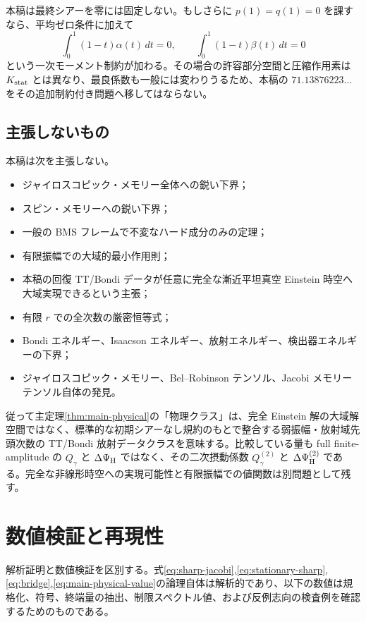 本稿は最終シアーを零には固定しない。もしさらに $p(1)=q(1)=0$ を課すなら、平均ゼロ条件に加えて
\[
\int_0^1(1-t)\alpha(t)\,dt=0,\qquad
\int_0^1(1-t)\beta(t)\,dt=0
\]
という一次モーメント制約が加わる。その場合の許容部分空間と圧縮作用素は $K_{\rm stat}$ とは異なり、最良係数も一般には変わりうるため、本稿の $71.13876223\ldots$ をその追加制約付き問題へ移してはならない。

\subsection{主張しないもの}
本稿は次を主張しない。
\begin{itemize}
\item ジャイロスコピック・メモリー全体への鋭い下界；
\item スピン・メモリーへの鋭い下界；
\item 一般の BMS フレームで不変なハード成分のみの定理；
\item 有限振幅での大域的最小作用則；
\item 本稿の回復 TT/Bondi データが任意に完全な漸近平坦真空 Einstein 時空へ大域実現できるという主張；
\item 有限 $r$ での全次数の厳密恒等式；
\item Bondi エネルギー、Isaacson エネルギー、放射エネルギー、検出器エネルギーの下界；
\item ジャイロスコピック・メモリー、Bel--Robinson テンソル、Jacobi メモリーテンソル自体の発見。
\end{itemize}

従って主定理\ref{thm:main-physical}の「物理クラス」は、完全 Einstein 解の大域解空間ではなく、標準的な初期シアーなし規約のもとで整合する弱振幅・放射域先頭次数の TT/Bondi 放射データクラスを意味する。比較している量も full finite-amplitude の $Q_\gamma$ と $\Delta\Psi_{\rm H}$ ではなく、その二次摂動係数 $Q_\gamma^{(2)}$ と $\Delta\Psi_{\rm H}^{(2)}$ である。完全な非線形時空への実現可能性と有限振幅での値関数は別問題として残す。

\section{数値検証と再現性}
解析証明と数値検証を区別する。式\eqref{eq:sharp-jacobi},\eqref{eq:stationary-sharp},\eqref{eq:bridge},\eqref{eq:main-physical-value}の論理自体は解析的であり、以下の数値は規格化、符号、終端量の抽出、制限スペクトル値、および反例志向の検査例を確認するためのものである。

